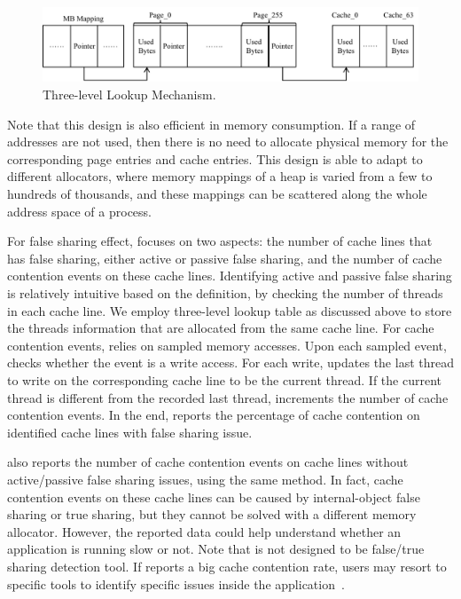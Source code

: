 \begin{figure}[!h]
\centering
\includegraphics[width=\columnwidth]{figures/lookup}
\caption{Three-level Lookup Mechanism.\label{fig:lookup}}
\end{figure}

Note that this design is also efficient in memory consumption. If a range of addresses are not used, then there is no need to allocate physical memory for the corresponding page entries and cache entries. This design is able to adapt to different allocators, where memory mappings of a heap is varied from a few to hundreds of thousands, and these mappings can be scattered along the whole address space of a process. 

For false sharing effect, \MP{} focuses on two aspects: the number of cache lines that has false sharing, either active or passive false sharing, and the number of cache contention events on these cache lines. Identifying active and passive false sharing is relatively intuitive based on the definition, by checking the number of threads in each cache line. We employ three-level lookup table as discussed above to store the threads information that are allocated from the same cache line. 
For cache contention events, \MP{} relies on sampled memory accesses. Upon each sampled event, \MP{} checks whether the event is a write access. For each write, \MP{} updates the last thread to write on the corresponding cache line to be the current thread. If the current thread is different from the recorded last thread, \MP{} increments the number of cache contention events. In the end, \MP{} reports the percentage of cache contention on identified cache lines with false sharing issue. 

\MP{} also reports the number of cache contention events on cache lines without active/passive false sharing issues, using the same method. In fact, cache contention events on these cache lines can be caused by internal-object false sharing or true sharing, but they cannot be solved with a different memory allocator. However, the reported data could help understand whether an application is running slow or not. Note that \MP{} is not designed to be false/true sharing detection tool. If \MP{} reports a big cache contention rate, users may resort to specific tools to identify specific issues inside the application~\cite{Sheriff, Predator, DBLP:conf/ppopp/ChabbiWL18}. 
   

